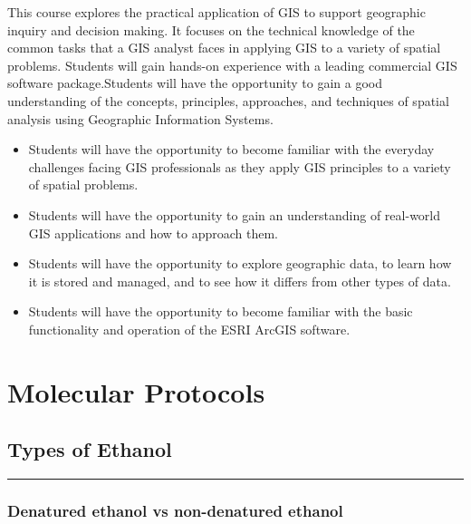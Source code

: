 \documentclass[
  letterpaper,
  DIV=11,
  numbers=noendperiod]{scrreprt}
\begin{document}
This course explores the practical application of GIS to support
geographic inquiry and decision making. It focuses on the technical
knowledge of the common tasks that a GIS analyst faces in applying GIS
to a variety of spatial problems. Students will gain hands-on experience
with a leading commercial GIS software package.Students will have the
opportunity to gain a good understanding of the concepts, principles,
approaches, and techniques of spatial analysis using Geographic
Information Systems.

\begin{itemize}
\item
  Students will have the opportunity to become familiar with the
  everyday challenges facing GIS professionals as they apply GIS
  principles to a variety of spatial problems.
\item
  Students will have the opportunity to gain an understanding of
  real-world GIS applications and how to approach them.
\item
  Students will have the opportunity to explore geographic data, to
  learn how it is stored and managed, and to see how it differs from
  other types of data.
\item
  Students will have the opportunity to become familiar with the basic
  functionality and operation of the ESRI ArcGIS software.
\end{itemize}

\part{Molecular Protocols}

\hypertarget{types-of-ethanol}{%
\chapter{Types of Ethanol}\label{types-of-ethanol}}

\begin{center}\rule{0.5\linewidth}{0.5pt}\end{center}

\hypertarget{denatured-ethanol-vs-non-denatured-ethanol}{%
\section*{\texorpdfstring{\textbf{Denatured ethanol vs non-denatured
ethanol}}{Denatured ethanol vs non-denatured ethanol}}\label{denatured-ethanol-vs-non-denatured-ethanol}}
\end{document}
